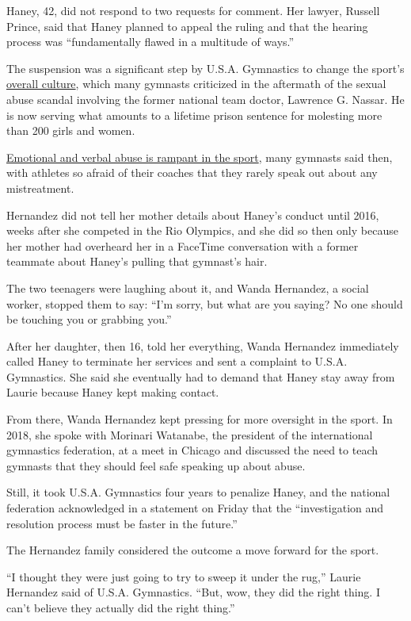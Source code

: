 Haney, 42, did not respond to two requests for comment. Her lawyer,
Russell Prince, said that Haney planned to appeal the ruling and that
the hearing process was ``fundamentally flawed in a multitude of ways.''

The suspension was a significant step by U.S.A. Gymnastics to change the
sport's
\href{https://www.nytimes.com/2018/08/18/sports/gymnasts-coach-abuse.html}{overall
culture}, which many gymnasts criticized in the aftermath of the sexual
abuse scandal involving the former national team doctor, Lawrence G.
Nassar. He is now serving what amounts to a lifetime prison sentence for
molesting more than 200 girls and women.

\href{https://www.nytimes.com/2018/11/10/sports/-usa-gymnastics-scandal-.html}{Emotional
and verbal abuse is rampant in the sport}, many gymnasts said then, with
athletes so afraid of their coaches that they rarely speak out about any
mistreatment.

Hernandez did not tell her mother details about Haney's conduct until
2016, weeks after she competed in the Rio Olympics, and she did so then
only because her mother had overheard her in a FaceTime conversation
with a former teammate about Haney's pulling that gymnast's hair.

The two teenagers were laughing about it, and Wanda Hernandez, a social
worker, stopped them to say: ``I'm sorry, but what are you saying? No
one should be touching you or grabbing you.''

After her daughter, then 16, told her everything, Wanda Hernandez
immediately called Haney to terminate her services and sent a complaint
to U.S.A. Gymnastics. She said she eventually had to demand that Haney
stay away from Laurie because Haney kept making contact.

From there, Wanda Hernandez kept pressing for more oversight in the
sport. In 2018, she spoke with Morinari Watanabe, the president of the
international gymnastics federation, at a meet in Chicago and discussed
the need to teach gymnasts that they should feel safe speaking up about
abuse.

Still, it took U.S.A. Gymnastics four years to penalize Haney, and the
national federation acknowledged in a statement on Friday that the
``investigation and resolution process must be faster in the future.''

The Hernandez family considered the outcome a move forward for the
sport.

``I thought they were just going to try to sweep it under the rug,''
Laurie Hernandez said of U.S.A. Gymnastics. ``But, wow, they did the
right thing. I can't believe they actually did the right thing.''

